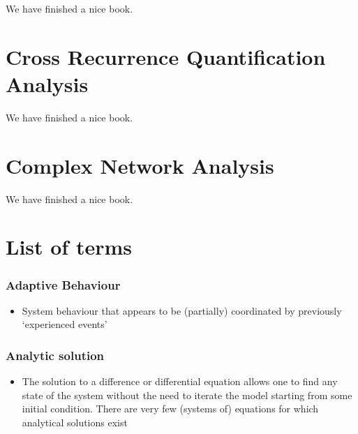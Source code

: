 \documentclass[12pt,]{book}
\providecommand{\tightlist}{%
  \setlength{\itemsep}{0pt}\setlength{\parskip}{0pt}}
\begin{document}
We have finished a nice book.

\hypertarget{cross-recurrence-quantification-analysis}{%
\chapter{Cross Recurrence Quantification Analysis}\label{cross-recurrence-quantification-analysis}}

We have finished a nice book.

\hypertarget{complex-network-analysis}{%
\chapter{Complex Network Analysis}\label{complex-network-analysis}}

We have finished a nice book.

\hypertarget{appendix-appendices}{%
\appendix}


\hypertarget{list-of-terms}{%
\chapter{\texorpdfstring{\textbf{List of terms}}{List of terms}}\label{list-of-terms}}

\hypertarget{Adap1}{%
\subsection*{\texorpdfstring{\textbf{Adaptive Behaviour}}{Adaptive Behaviour}}\label{Adap1}}

\begin{itemize}
\tightlist
\item
  System behaviour that appears to be (partially) coordinated by previously `experienced events'
\end{itemize}

\hypertarget{Anal2}{%
\subsection*{\texorpdfstring{\textbf{Analytic solution}}{Analytic solution}}\label{Anal2}}

\begin{itemize}
\tightlist
\item
  The solution to a difference or differential equation allows one to find any state of the system without the need to iterate the model starting from some initial condition. There are very few (systems of) equations for which analytical solutions exist
\end{itemize}
\end{document}
